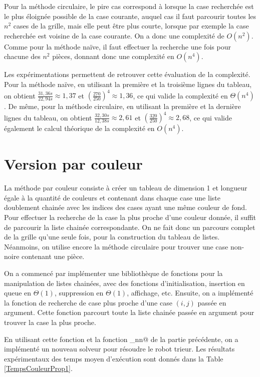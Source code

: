 \documentclass[a4paper,12pt]{article}
\numberwithin{equation}{section}
\begin{document}
Pour la méthode circulaire, le pire cas correspond à lorsque la case recherchée est le plus éloignée possible de la case courante, auquel cas il faut parcourir toutes les $n^2$ cases de la grille, mais elle peut être plus courte, lorsque par exemple la case recherchée est voisine de la case courante. On a donc une complexité de $O(n^2)$. Comme pour la méthode naïve, il faut effectuer la recherche une fois pour chacune des $n^2$ pièces, donnant donc une complexité en $O(n^4)$.

Les expérimentations permettent de retrouver cette évaluation de la complexité. Pour la méthode naïve, en utilisant la première et la troisième lignes du tableau, on obtient $\frac{31,36 s}{22,94 s} \approx 1,37$ et $\left(\frac{270}{250}\right)^4 \approx 1,36$, ce qui valide la complexité en $\Theta(n^4)$. De même, pour la méthode circulaire, en utilisant la première et la dernière lignes du tableau, on obtient $\frac{32,30 s}{12,38 s} \approx 2,61$ et $\left(\frac{320}{250}\right)^4 \approx 2,68$, ce qui valide également le calcul théorique de la complexité en $O(n^4)$.

\section{Version par couleur}

La méthode par couleur consiste à créer un tableau de dimension 1 et longueur égale à la quantité de couleurs et contenant dans chaque case une liste doublement chainée avec les indices des cases ayant une même couleur de fond. Pour effectuer la recherche de la case la plus proche d'une couleur donnée, il suffit de parcourir la liste chainée correspondante. On ne fait donc un parcours complet de la grille qu'une seule fois, pour la construction du tableau de listes. Néanmoins, on utilise encore la méthode circulaire pour trouver une case non-noire contenant une pièce.

On a commencé par implémenter une bibliothèque de fonctions pour la manipulation de listes chainées, avec des fonctions d'initialisation, insertion en queue en $\Theta(1)$, suppression en $\Theta(1)$, affichage, etc. Ensuite, on a implémenté la fonction \verb@LDC@\allowbreak\verb@rechercherPlusProcheCase@ de recherche de case plus proche d'une case $(i, j)$ passée en argument. Cette fonction parcourt toute la liste chainée passée en argument pour trouver la case la plus proche.

En utilisant cette fonction et la fonction \verb@Recherche@\allowbreak\verb@CaseCirculaire_nn@ de la partie précédente, on a implémenté un nouveau solveur pour résoudre le robot trieur. Les résultats expérimentaux des temps moyen d'exécution sont donnés dans la Table \ref{TempsCouleurProp1}.
\end{document}
